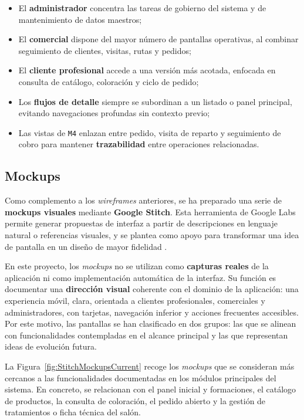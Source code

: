 \begin{itemize}
    \item El \textbf{administrador} concentra las tareas de gobierno del sistema y de mantenimiento de datos maestros;
    \item El \textbf{comercial} dispone del mayor número de pantallas operativas, al combinar seguimiento de clientes, visitas, rutas y pedidos;
    \item El \textbf{cliente profesional} accede a una versión más acotada, enfocada en consulta de catálogo, coloración y ciclo de pedido;
    \item Los \textbf{flujos de detalle} siempre se subordinan a un listado o panel principal, evitando navegaciones profundas sin contexto previo;
    \item Las vistas de \texttt{M4} enlazan entre pedido, visita de reparto y seguimiento de cobro para mantener \textbf{trazabilidad} entre operaciones relacionadas.
\end{itemize}

\subsection{Mockups}
\label{sec:uiMockups}

Como complemento a los \textit{wireframes} anteriores, se ha preparado una serie de \textbf{mockups visuales} mediante \textbf{Google Stitch}. Esta herramienta de Google Labs permite generar propuestas de interfaz a partir de descripciones en lenguaje natural o referencias visuales, y se plantea como apoyo para transformar una idea de pantalla en un diseño de mayor fidelidad \citep{google-stitch,google-stitch-developers-blog}.

En este proyecto, los \textit{mockups} no se utilizan como \textbf{capturas reales} de la aplicación ni como implementación automática de la interfaz. Su función es documentar una \textbf{dirección visual} coherente con el dominio de la aplicación: una experiencia móvil, clara, orientada a clientes profesionales, comerciales y administradores, con tarjetas, navegación inferior y acciones frecuentes accesibles. Por este motivo, las pantallas se han clasificado en dos grupos: las que se alinean con funcionalidades contempladas en el alcance principal y las que representan ideas de evolución futura.

La Figura~\ref{fig:StitchMockupsCurrent} recoge los \textit{mockups} que se consideran más cercanos a las funcionalidades documentadas en los módulos principales del sistema. En concreto, se relacionan con el panel inicial y formaciones, el catálogo de productos, la consulta de coloración, el pedido abierto y la gestión de tratamientos o ficha técnica del salón.

